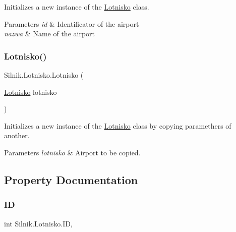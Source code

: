 Initializes a new instance of the \mbox{\hyperlink{class_silnik_1_1_lotnisko}{Lotnisko}} class. 


\begin{DoxyParams}{Parameters}
{\em id} & Identificator of the airport\\
\hline
{\em nazwa} & Name of the airport\\
\hline
\end{DoxyParams}
\mbox{\label{class_silnik_1_1_lotnisko_af5760fdf88ce17c44f0910b9cce9f1e7}} 
\subsubsection{\texorpdfstring{Lotnisko()}{Lotnisko()}\hspace{0.1cm}{\footnotesize\ttfamily [2/2]}}
{\footnotesize\ttfamily Silnik.\+Lotnisko.\+Lotnisko (\begin{DoxyParamCaption}\item[{\mbox{\hyperlink{class_silnik_1_1_lotnisko}{Lotnisko}}}]{lotnisko }\end{DoxyParamCaption})}



Initializes a new instance of the \mbox{\hyperlink{class_silnik_1_1_lotnisko}{Lotnisko}} class by copying paramethers of another. 


\begin{DoxyParams}{Parameters}
{\em lotnisko} & Airport to be copied.\\
\hline
\end{DoxyParams}


\subsection{Property Documentation}
\mbox{\label{class_silnik_1_1_lotnisko_a3b58935c64a4b7ebe2a3548b5f968583}} 
\subsubsection{\texorpdfstring{ID}{ID}}
{\footnotesize\ttfamily int Silnik.\+Lotnisko.\+ID\hspace{0.3cm}{\ttfamily [get]}, {\ttfamily [set]}}



